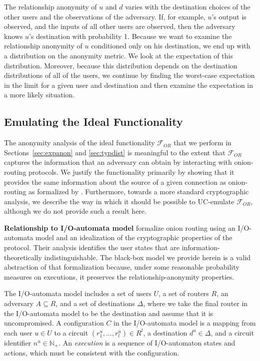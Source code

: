 \documentclass[prodmode,acmtissec]{acmsmall}
\begin{document}
The relationship anonymity of $u$ and $d$ varies with the destination
choices of the other users and the observations of the adversary.  If,
for example, $u$'s output is observed, and the inputs of all other
users are observed, then the adversary knows $u$'s destination with
probability 1.  Because we want to examine the relationship anonymity
of $u$ conditioned only on his destination, we end up with a
distribution on the anonymity metric.  We look at the expectation of
this distribution.  Moreover, because this distribution depends on the
destination distributions of all of the users, we continue by finding
the worst-case expectation in the limit for a given user and
destination and then examine the expectation in a more likely
situation.


\subsection{Emulating the Ideal Functionality} \label{subsec:fc2uc}
The anonymity analysis of the ideal functionality $\mathcal{F}_{OR}$ that we perform in Sections~\ref{sec:expanon} and \ref{sec:typdist} is meaningful to the extent that $\mathcal{F}_{OR}$ captures the information that an adversary can obtain by interacting with onion-routing protocols. We justify the functionality primarily by showing that it provides the same information about the source of a given connection as onion-routing as formalized by . Furthermore, towards a more standard cryptographic analysis, we describe the way in which it should be possible to UC-emulate $\mathcal{F}_{OR}$, although we do not provide such a result here.

{\bf Relationship to I/O-automata model}
 formalize onion routing using an I/O-automata model\cite{LYNCH} and an idealization of the cryptographic properties of the protocol. Their analysis identifies the user states that are information-theoretically indistinguishable. The black-box model we provide herein is a valid abstraction of that formalization because, under some reasonable probability measures on executions, it preserves the relationship-anonymity properties.

The I/O-automata model includes a set of users $U$, a set of routers $R$, an adversary $A\subseteq R$, and a set of destinations $\Delta$, where we take the final router in the I/O-automata model to be the destination and assume that it is uncompromised.  A configuration $C$ in the I/O-automata model is a mapping from each user $u\in U$ to a circuit $(r^u_1,\ldots ,r^u_l)\in R^l$, a destination $d^u\in \Delta$, and a circuit identifier $n^u\in \mathbb{N}_+$.  An \emph{execution} is a sequence of I/O-automaton states and actions, which must be consistent with the configuration.
\end{document}
